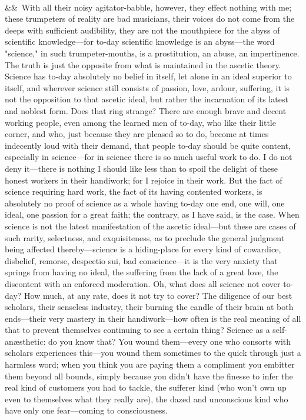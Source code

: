 \documentclass[12pt]{article}
\newcommand{\para}[1][]{\par\noindent\ifx&#1&\else\textsuperscript{\footnotesize #1}~\fi}
\begin{document}
\para With all their noisy agitator-babble, however, they effect nothing with me; these trumpeters of reality are bad musicians, their voices do not come from the deeps with sufficient audibility, they are not the mouthpiece for the abyss of scientific knowledge---for to-day scientific knowledge is an abyss---the word "science," in such trumpeter-mouths, is a prostitution, an abuse, an impertinence. The truth is just the opposite from what is maintained in the ascetic theory. Science has to-day absolutely no belief in itself, let alone in an ideal superior to itself, and wherever science still consists of passion, love, ardour, suffering, it is not the opposition to that ascetic ideal, but rather the incarnation of its latest and noblest form. Does that ring strange? There are enough brave and decent working people, even among the learned men of to-day, who like their little corner, and who, just because they are pleased so to do, become at times indecently loud with their demand, that people to-day should be quite content, especially in science---for in science there is so much useful work to do. I do not deny it---there is nothing I should like less than to spoil the delight of these honest workers in their handiwork; for I rejoice in their work. But the fact of science requiring hard work, the fact of its having contented workers, is absolutely no proof of science as a whole having to-day one end, one will, one ideal, one passion for a great faith; the contrary, as I have said, is the case. When science is not the latest manifestation of the ascetic ideal---but these are cases of such rarity, selectness, and exquisiteness, as to preclude the general judgment being affected thereby---science is a hiding-place for every kind of cowardice, disbelief, remorse, despectio sui, bad conscience---it is the very anxiety that springs from having no ideal, the suffering from the lack of a great love, the discontent with an enforced moderation. Oh, what does all science not cover to-day? How much, at any rate, does it not try to cover? The diligence of our best scholars, their senseless industry, their burning the candle of their brain at both ends---their very mastery in their handiwork---how often is the real meaning of all that to prevent themselves continuing to see a certain thing? Science as a self-anæsthetic: do you know that? You wound them---every one who consorts with scholars experiences this---you wound them sometimes to the quick through just a harmless word; when you think you are paying them a compliment you embitter them beyond all bounds, simply because you didn't have the finesse to infer the real kind of customers you had to tackle, the sufferer kind (who won't own up even to themselves what they really are), the dazed and unconscious kind who have only one fear---coming to consciousness.
\end{document}
